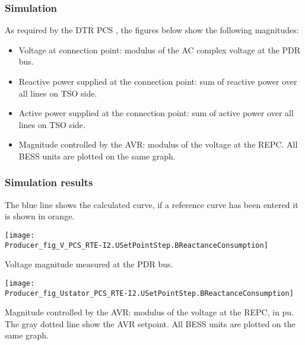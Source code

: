     \subsubsection{Simulation}
    As required by the DTR PCS \DTRPcs, the figures below show the
    following magnitudes:
    \begin{itemize}
        \item Voltage at connection point: modulus of the AC complex voltage at
        the PDR bus.
        \item Reactive power supplied at the connection point: sum of reactive power
        over all lines on TSO side.
        \item Active power supplied at the connection point: sum of active power
        over all lines on TSO side.
        \item Magnitude controlled by the AVR: modulus of the voltage at the REPC.
        All BESS units are plotted on the same graph.
    \end{itemize}

    \subsubsection{Simulation results}
    The blue line shows the calculated curve, if a reference curve has been entered it is
    shown in orange.

    \noindent
    \begin{minipage}[t]{0.48\textwidth}
        \centering
        \texttt{[image: \\Producer\_fig\_V\_PCS\_RTE-I2.USetPointStep.BReactanceConsumption]}
        \begin{minipage}[t]{0.8\textwidth}
            \small Voltage magnitude measured at the PDR bus.
        \end{minipage}
    \end{minipage}
    \hfill
    \begin{minipage}[t]{0.48\textwidth}
        \centering
        \texttt{[image: \\Producer\_fig\_Ustator\_PCS\_RTE-I2.USetPointStep.BReactanceConsumption]}
        \begin{minipage}[t]{0.8\textwidth}
            \small Magnitude controlled by the AVR: modulus of the voltage at the REPC, in pu.
            The gray dotted line show the AVR setpoint. All BESS units are plotted on the same
            graph.
        \end{minipage}
    \end{minipage}

